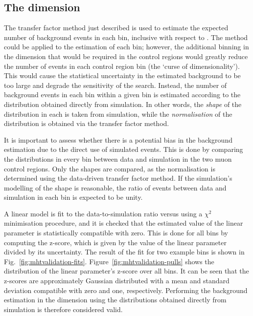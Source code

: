 \subsection{The \mht dimension}
\label{sec:analysis-estimation-mht}

The transfer factor method just described is used to estimate the expected 
number of background events in each \njnbht bin, inclusive with respect to 
\mht. 
The method could be applied to the estimation of each \njnbhtmht bin; however, 
the additional binning in the \mht dimension that would be required in the 
control regions would greatly reduce the number of events in each control 
region bin (the `curse of dimensionality'). This would cause the statistical 
uncertainty in the estimated background to be too large and degrade the 
sensitivity of the search. 
Instead, the number of background events in each \mht bin within a given 
\njnbht bin is estimated according to the \mht distribution obtained directly 
from simulation. 
In other words, the \textit{shape} of the \mht distribution in each \njnbht is 
taken from simulation, while the \textit{normalisation} of the distribution is 
obtained via the transfer factor method.

It is important to assess whether there is a potential bias in the background 
estimation due to the direct use of simulated events.
This is done by comparing the \mht distributions in every \njnbht bin between 
data and simulation in the two muon control regions. Only the shapes are 
compared, as the normalisation is determined using the data-driven transfer 
factor method. If the simulation's modelling of the \mht shape is reasonable, 
the ratio of events between data and simulation in each \mht bin is expected to 
be unity.

A linear model is fit to the data-to-simulation ratio versus \mht using a 
$\chi^2$ minimisation procedure, and it is checked that the estimated value of 
the linear parameter is statistically compatible with zero. This is done for 
all \njnbht bins by computing the z-score, which is given by the value of the 
linear parameter divided by its uncertainty. The result of the fit for two 
example \njnbht bins is shown in Fig.~\ref{fig:mhtvalidation-fits}. 
Figure~\ref{fig:mhtvalidation-pulls} shows the distribution of the linear 
parameter's z-score over all \njnbht bins. 
It can be seen that the z-scores are approximately Gaussian distributed with a 
mean and standard deviation compatible with zero and one, respectively.
Performing the background estimation in the \mht dimension using the 
distributions obtained directly from simulation is therefore considered valid.

